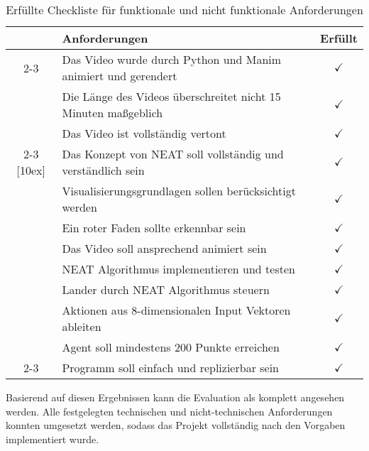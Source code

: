\begin{table}[h]
	\centering
	\begin{tabularx}{\textwidth}{|c|X|c|}
		\hline
		\multirow{34}{*}[4ex]{\rotatebox[origin=c]{90}{\centering \textbf{Visualisierung}}} & \textbf{Anforderungen} & \textbf{Erfüllt} \\
		\cline{2-3}
		& Das Video wurde durch Python und Manim animiert und gerendert & $\checkmark$ \\[4ex]
		& Die Länge des Videos überschreitet nicht 15 Minuten maßgeblich & $\checkmark$ \\[4ex]
		& Das Video ist vollständig vertont & $\checkmark$ \\[4ex]
		\cline{2-3}
		\multirow{44}{*}[10ex]{\rotatebox[origin=c]{90}{\centering \textbf{Implementierung}}} & Das Konzept von NEAT soll vollständig und verständlich sein & $\checkmark$ \\[4ex]
		& Visualisierungsgrundlagen sollen berücksichtigt werden & $\checkmark$ \\[4ex]
		& Ein roter Faden sollte erkennbar sein & $\checkmark$ \\[4ex]
		& Das Video soll ansprechend animiert sein & $\checkmark$ \\[4ex]
		\hline
		& NEAT Algorithmus implementieren und testen & $\checkmark$ \\[4ex]
		& Lander durch NEAT Algorithmus steuern & $\checkmark$ \\[4ex]
		& Aktionen aus 8-dimensionalen Input Vektoren ableiten & $\checkmark$ \\[4ex]
		& Agent soll mindestens 200 Punkte erreichen & $\checkmark$ \\[4ex]
		\cline{2-3}
		& Programm soll einfach und replizierbar sein & $\checkmark$ \\[4ex]
		\hline
	\end{tabularx}
	\caption{Erfüllte Checkliste für funktionale und nicht funktionale Anforderungen}
\end{table}

Basierend auf diesen Ergebnissen kann die Evaluation als komplett angesehen werden. Alle festgelegten technischen und nicht-technischen Anforderungen konnten umgesetzt werden, sodass das Projekt vollständig nach den Vorgaben implementiert wurde.

